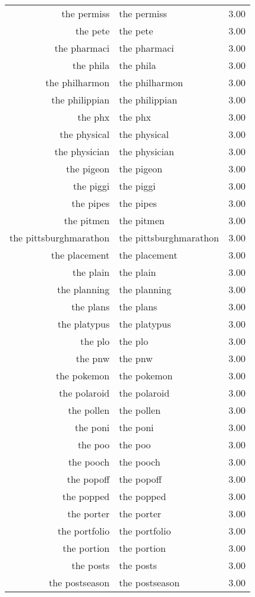 \begin{table}[ht]
\begin{tabular}{rlr}
  the permiss & the permiss & 3.00 \\ 
  the pete & the pete & 3.00 \\ 
  the pharmaci & the pharmaci & 3.00 \\ 
  the phila & the phila & 3.00 \\ 
  the philharmon & the philharmon & 3.00 \\ 
  the philippian & the philippian & 3.00 \\ 
  the phx & the phx & 3.00 \\ 
  the physical & the physical & 3.00 \\ 
  the physician & the physician & 3.00 \\ 
  the pigeon & the pigeon & 3.00 \\ 
  the piggi & the piggi & 3.00 \\ 
  the pipes & the pipes & 3.00 \\ 
  the pitmen & the pitmen & 3.00 \\ 
  the pittsburghmarathon & the pittsburghmarathon & 3.00 \\ 
  the placement & the placement & 3.00 \\ 
  the plain & the plain & 3.00 \\ 
  the planning & the planning & 3.00 \\ 
  the plans & the plans & 3.00 \\ 
  the platypus & the platypus & 3.00 \\ 
  the plo & the plo & 3.00 \\ 
  the pnw & the pnw & 3.00 \\ 
  the pokemon & the pokemon & 3.00 \\ 
  the polaroid & the polaroid & 3.00 \\ 
  the pollen & the pollen & 3.00 \\ 
  the poni & the poni & 3.00 \\ 
  the poo & the poo & 3.00 \\ 
  the pooch & the pooch & 3.00 \\ 
  the popoff & the popoff & 3.00 \\ 
  the popped & the popped & 3.00 \\ 
  the porter & the porter & 3.00 \\ 
  the portfolio & the portfolio & 3.00 \\ 
  the portion & the portion & 3.00 \\ 
  the posts & the posts & 3.00 \\ 
  the postseason & the postseason & 3.00 \\ 

\end{tabular}
\end{table}
